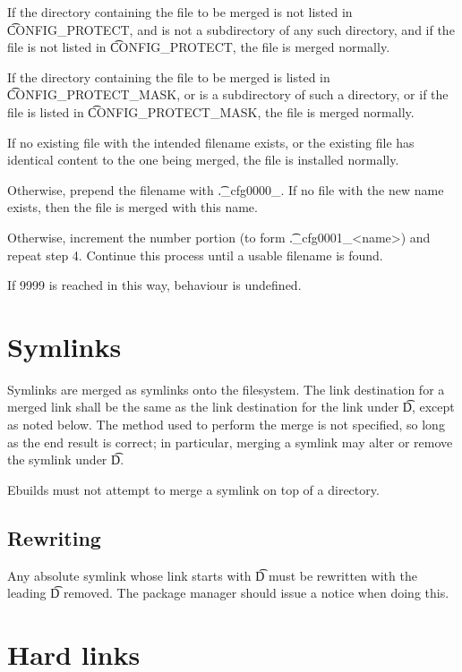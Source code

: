\begin{compactenum}
\item If the directory containing the file to be merged is not listed in \t{CONFIG\_PROTECT}, and
     is not a subdirectory of any such directory, and if the file is not listed in \t{CONFIG\_PROTECT},
     the file is merged normally.
\item If the directory containing the file to be merged is listed in \t{CONFIG\_PROTECT\_MASK}, or
    is a subdirectory of such a directory, or if the file is listed in \t{CONFIG\_PROTECT\_MASK},
    the file is merged normally.
\item If no existing file with the intended filename exists, or the existing file has identical
    content to the one being merged, the file is installed normally.
\item Otherwise, prepend the filename with \t{.\_cfg0000\_}. If no file with the new name exists,
    then the file is merged with this name.
\item Otherwise, increment the number portion (to form \t{.\_cfg0001\_<name>}) and repeat step 4.
    Continue this process until a usable filename is found.
\item If 9999 is reached in this way, behaviour is undefined.
\end{compactenum}

\section{Symlinks}

Symlinks are merged as symlinks onto the filesystem. The link destination for a merged link shall be
the same as the link destination for the link under \t{D}, except as noted below. The method used to
perform the merge is not specified, so long as the end result is correct; in particular, merging a
symlink may alter or remove the symlink under \t{D}.

Ebuilds must not attempt to merge a symlink on top of a directory.

\subsection{Rewriting}

Any absolute symlink whose link starts with \t{D} must be rewritten with the leading \t{D} removed.
The package manager should issue a notice when doing this.

\section{Hard links}

